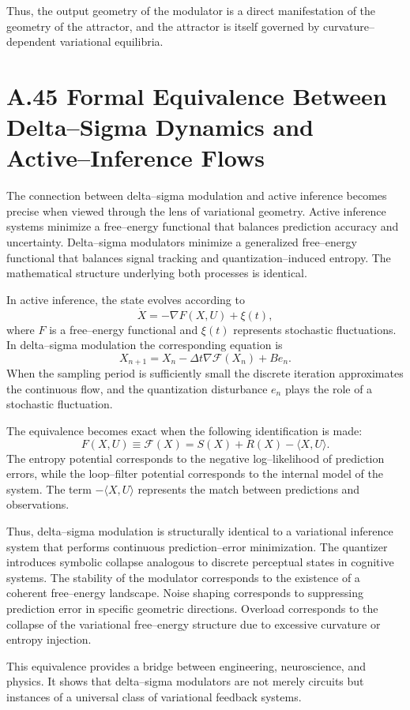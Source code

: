 Thus, the output geometry of the modulator is a direct manifestation of the geometry of the attractor, and the attractor is itself governed by curvature–dependent variational equilibria.

\section{A.45 Formal Equivalence Between Delta–Sigma Dynamics and Active–Inference Flows}

The connection between delta–sigma modulation and active inference becomes precise when viewed through the lens of variational geometry. Active inference systems minimize a free–energy functional that balances prediction accuracy and uncertainty. Delta–sigma modulators minimize a generalized free–energy functional that balances signal tracking and quantization–induced entropy. The mathematical structure underlying both processes is identical.

In active inference, the state evolves according to
\[
\dot{X} = -\nabla F(X,U) + \xi(t),
\]
where \(F\) is a free–energy functional and \(\xi(t)\) represents stochastic fluctuations. In delta–sigma modulation the corresponding equation is
\[
X_{n+1} = X_n - \Delta t \nabla \mathcal{F}(X_n) + B e_n.
\]
When the sampling period is sufficiently small the discrete iteration approximates the continuous flow, and the quantization disturbance \(e_n\) plays the role of a stochastic fluctuation.

The equivalence becomes exact when the following identification is made:
\[
F(X,U) \equiv \mathcal{F}(X) = S(X) + R(X) - \langle X, U \rangle.
\]
The entropy potential corresponds to the negative log–likelihood of prediction errors, while the loop–filter potential corresponds to the internal model of the system. The term \(-\langle X,U\rangle\) represents the match between predictions and observations.

Thus, delta–sigma modulation is structurally identical to a variational inference system that performs continuous prediction–error minimization. The quantizer introduces symbolic collapse analogous to discrete perceptual states in cognitive systems. The stability of the modulator corresponds to the existence of a coherent free–energy landscape. Noise shaping corresponds to suppressing prediction error in specific geometric directions. Overload corresponds to the collapse of the variational free–energy structure due to excessive curvature or entropy injection.

This equivalence provides a bridge between engineering, neuroscience, and physics. It shows that delta–sigma modulators are not merely circuits but instances of a universal class of variational feedback systems.


